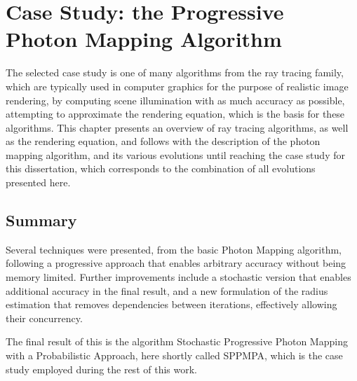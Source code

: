 \documentclass[main.tex]{subfiles}
\begin{document}
\chapter{Case Study: the Progressive Photon Mapping Algorithm} \label{chapter:case_study}

The selected case study is one of many algorithms from the ray tracing family, which are typically used in computer graphics for the purpose of realistic image rendering, by computing scene illumination with as much accuracy as possible, attempting to approximate the rendering equation, which is the basis for these algorithms. This chapter presents an overview of ray tracing algorithms, as well as the rendering equation, and follows with the description of the photon mapping algorithm, and its various evolutions until reaching the case study for this dissertation, which corresponds to the combination of all evolutions presented here.







\section{Summary}

Several techniques were presented, from the basic Photon Mapping algorithm, following a progressive approach that enables arbitrary accuracy without being memory limited. Further improvements include a stochastic version that enables additional accuracy in the final result, and a new formulation of the radius estimation that removes dependencies between iterations, effectively allowing their concurrency.

The final result of this is the algorithm Stochastic Progressive Photon Mapping with a Probabilistic Approach, here shortly called SPPMPA, which is the case study employed during the rest of this work.
\end{document}
